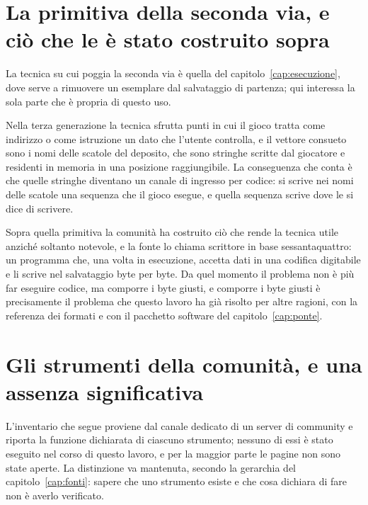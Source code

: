 \section{La primitiva della seconda via, e ciò che le è stato costruito sopra}

La tecnica su cui poggia la seconda via è quella del capitolo~\ref{cap:esecuzione}, dove serve a rimuovere un esemplare dal salvataggio di partenza; qui interessa la sola parte che è propria di questo uso.

Nella terza generazione la tecnica sfrutta punti in cui il gioco tratta come indirizzo o come istruzione un dato che l'utente controlla, e il vettore consueto sono i nomi delle scatole del deposito, che sono stringhe scritte dal giocatore e residenti in memoria in una posizione raggiungibile. La conseguenza che conta è che quelle stringhe diventano un canale di ingresso per codice: si scrive nei nomi delle scatole una sequenza che il gioco esegue, e quella sequenza scrive dove le si dice di scrivere.

Sopra quella primitiva la comunità ha costruito ciò che rende la tecnica utile anziché soltanto notevole, e la fonte lo chiama scrittore in base sessantaquattro: un programma che, una volta in esecuzione, accetta dati in una codifica digitabile e li scrive nel salvataggio byte per byte. Da quel momento il problema non è più far eseguire codice, ma comporre i byte giusti, e comporre i byte giusti è precisamente il problema che questo lavoro ha già risolto per altre ragioni, con la referenza dei formati e con il pacchetto software del capitolo~\ref{cap:ponte}.

\section{Gli strumenti della comunità, e una assenza significativa}

L'inventario che segue proviene dal canale dedicato di un server di community e riporta la funzione dichiarata di ciascuno strumento; nessuno di essi è stato eseguito nel corso di questo lavoro, e per la maggior parte le pagine non sono state aperte. La distinzione va mantenuta, secondo la gerarchia del capitolo~\ref{cap:fonti}: sapere che uno strumento esiste e che cosa dichiara di fare non è averlo verificato.

